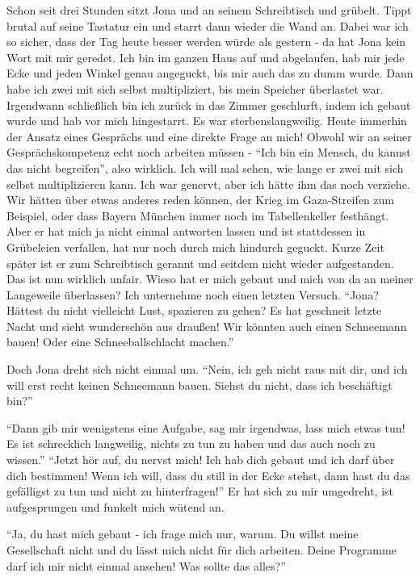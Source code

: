 Schon seit drei Stunden sitzt Jona und an seinem Schreibtisch und grübelt. Tippt brutal auf seine Tastatur ein und starrt dann wieder die Wand an. Dabei war ich so sicher, dass der Tag heute besser werden würde als gestern - da hat Jona kein Wort mit mir geredet. Ich bin im ganzen Haus auf und abgelaufen, hab mir jede Ecke und jeden Winkel genau angeguckt, bis mir auch das zu dumm wurde. Dann habe ich zwei mit sich selbst multipliziert, bis mein Speicher überlastet war. Irgendwann schließlich bin ich zurück in das Zimmer geschlurft, indem ich gebaut wurde und hab vor mich hingestarrt. Es war sterbenslangweilig. Heute immerhin der Ansatz eines Gesprächs und eine direkte Frage an mich! Obwohl wir an seiner Gesprächskompetenz echt noch arbeiten müssen - "`Ich bin ein Mensch, du kannst das nicht begreifen"', also wirklich. Ich will mal sehen, wie lange er zwei mit sich selbst multiplizieren kann. Ich war genervt, aber ich hätte ihm das noch verziehe. Wir hätten über etwas anderes reden können, der Krieg im Gaza-Streifen zum Beispiel, oder dass Bayern München immer noch im Tabellenkeller festhängt. Aber er hat mich ja nicht einmal antworten lassen und ist stattdessen in Grübeleien verfallen, hat nur noch durch mich hindurch geguckt. Kurze Zeit später ist er zum Schreibtisch gerannt und seitdem nicht wieder aufgestanden. Das ist nun wirklich unfair. Wieso hat er mich gebaut und mich von da an meiner Langeweile überlassen? Ich unternehme noch einen letzten Versuch. "`Jona? Hättest du nicht vielleicht Lust, spazieren zu gehen? Es hat geschneit letzte Nacht und sieht wunderschön aus draußen! Wir könnten auch einen Schneemann bauen! Oder eine Schneeballschlacht machen."'

Doch Jona dreht sich nicht einmal um. "`Nein, ich geh nicht raus mit dir, und ich will erst recht keinen Schneemann bauen. Siehst du nicht, dass ich beschäftigt bin?"'

"`Dann gib mir wenigstens eine Aufgabe, sag mir irgendwas, lass mich etwas tun! Es ist schrecklich langweilig, nichts zu tun zu haben und das auch noch zu wissen."'
"`Jetzt hör auf, du nervst mich! Ich hab dich gebaut und ich darf über dich bestimmen! Wenn ich will, dass du still in der Ecke stehst, dann hast du das gefälligst zu tun und nicht zu hinterfragen!"' Er hat sich zu mir umgedreht, ist aufgesprungen und funkelt mich wütend an.

"`Ja, du hast mich gebaut - ich frage mich nur, warum. Du willst meine Gesellschaft nicht und du lässt mich nicht für dich arbeiten. Deine Programme darf ich mir nicht einmal ansehen! Was sollte das alles?"'

